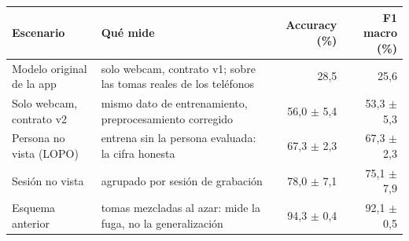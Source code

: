 \begin{tabular}{llrr}
\toprule
Escenario & Qué mide & Accuracy (\%) & F1 macro (\%) \\
\midrule
Modelo original de la app & solo webcam, contrato v1; sobre las tomas reales de los teléfonos & 28,5 & 25,6 \\
Solo webcam, contrato v2 & mismo dato de entrenamiento, preprocesamiento corregido & 56,0 $\pm$ 5,4 & 53,3 $\pm$ 5,3 \\
Persona no vista (LOPO) & entrena sin la persona evaluada: la cifra honesta & 67,3 $\pm$ 2,3 & 67,3 $\pm$ 2,3 \\
Sesión no vista & agrupado por sesión de grabación & 78,0 $\pm$ 7,1 & 75,1 $\pm$ 7,9 \\
Esquema anterior & tomas mezcladas al azar: mide la fuga, no la generalización & 94,3 $\pm$ 0,4 & 92,1 $\pm$ 0,5 \\
\bottomrule
\end{tabular}
